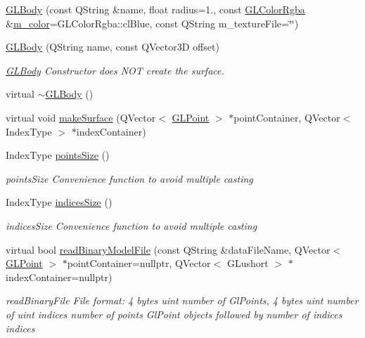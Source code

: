 \begin{DoxyCompactItemize}
\item 
\mbox{\hyperlink{class_g_l_body_a86dd61f116bfd01d8f4d8656cfe1ddc9}{G\+L\+Body}} (const Q\+String \&name, float radius=1., const \mbox{\hyperlink{class_g_l_color_rgba}{G\+L\+Color\+Rgba}} \&\mbox{\hyperlink{class_g_l_body_a267b5c0fbe5752370197012975663dca}{m\+\_\+color}}=G\+L\+Color\+Rgba\+::cl\+Blue, const Q\+String m\+\_\+texture\+File=\char`\"{}\char`\"{})
\item 
\mbox{\hyperlink{class_g_l_body_a6e50d6cb10fbdb81e8aeb64ab3e46a66}{G\+L\+Body}} (Q\+String name, const Q\+Vector3D offset)
\begin{DoxyCompactList}\small\item\em \mbox{\hyperlink{class_g_l_body}{G\+L\+Body}} Constructor does N\+OT create the surface. \end{DoxyCompactList}\item 
virtual \mbox{\hyperlink{class_g_l_body_ac6cd2e5f6d0115cf6f6f0ae84c9d91a1}{$\sim$\+G\+L\+Body}} ()
\item 
virtual void \mbox{\hyperlink{class_g_l_body_a73e51b159f343d0bda87f50df382b7db}{make\+Surface}} (Q\+Vector$<$ \mbox{\hyperlink{class_g_l_point}{G\+L\+Point}} $>$ $\ast$point\+Container, Q\+Vector$<$ Index\+Type $>$ $\ast$index\+Container)
\item 
Index\+Type \mbox{\hyperlink{class_g_l_body_ab49318c0af2044a32ec6e7833a6224c1}{points\+Size}} ()
\begin{DoxyCompactList}\small\item\em points\+Size Convenience function to avoid multiple casting \end{DoxyCompactList}\item 
Index\+Type \mbox{\hyperlink{class_g_l_body_a10511a36b5bc7012290252f84d40ac74}{indices\+Size}} ()
\begin{DoxyCompactList}\small\item\em indices\+Size Convenience function to avoid multiple casting \end{DoxyCompactList}\item 
virtual bool \mbox{\hyperlink{class_g_l_body_ad6f12ae3d48aa96561138a8c91fab68a}{read\+Binary\+Model\+File}} (const Q\+String \&data\+File\+Name, Q\+Vector$<$ \mbox{\hyperlink{class_g_l_point}{G\+L\+Point}} $>$ $\ast$point\+Container=nullptr, Q\+Vector$<$ G\+Lushort $>$ $\ast$index\+Container=nullptr)
\begin{DoxyCompactList}\small\item\em read\+Binary\+File File format\+: 4 bytes uint number of Gl\+Points, 4 bytes uint number of uint indices number of points Gl\+Point objects followed by number of indices indices \end{DoxyCompactList}\item 

\end{DoxyCompactItemize}
